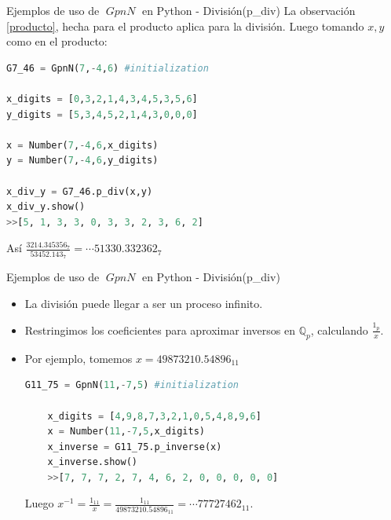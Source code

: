 \documentclass{beamer}
\theoremstyle{definition}
\numberwithin{equation}{section}
\newcommand{\Qp}{\mathbb{Q}_p}
\DeclareMathOperator{\gpn}{\mathit{{GpnN}}}
\begin{document}
\begin{frame}[fragile]{Ejemplos de uso de $\gpn$ en Python - División(p\_div) }
La observación \ref{producto}, hecha para el producto aplica para la división. Luego tomando $x,y$ como en el producto:

\begin{lstlisting}[language = Python, caption = división de números en $\mathit{G7\_46}$,basicstyle=\tiny]
G7_46 = GpnN(7,-4,6) #initialization

x_digits = [0,3,2,1,4,3,4,5,3,5,6]
y_digits = [5,3,4,5,2,1,4,3,0,0,0]

x = Number(7,-4,6,x_digits)
y = Number(7,-4,6,y_digits)

x_div_y = G7_46.p_div(x,y)
x_div_y.show()
>>[5, 1, 3, 3, 0, 3, 3, 2, 3, 6, 2]
\end{lstlisting}
Así $\frac{3214.345356_7}{53452.143_7}=\cdots51330.332362_7$
\end{frame}



\begin{frame}[fragile]{Ejemplos de uso de $\gpn$ en Python - División(p\_div) }
\begin{itemize}
	\item La división puede llegar a ser un proceso infinito.
	\item Restringimos los coeficientes para aproximar inversos en $\Qp$, calculando $\frac{1_p}{x}$.
	\item Por ejemplo, tomemos $x=49873210.54896_{11}$ 
	\begin{lstlisting}[language = Python, caption = inversión de números en $\mathit{G11\_75}$,basicstyle=\tiny]
	G11_75 = GpnN(11,-7,5) #initialization
	
	x_digits = [4,9,8,7,3,2,1,0,5,4,8,9,6]
	x = Number(11,-7,5,x_digits)
	x_inverse = G11_75.p_inverse(x)
	x_inverse.show()
	>>[7, 7, 7, 2, 7, 4, 6, 2, 0, 0, 0, 0, 0]
	\end{lstlisting}
	Luego $x^{-1}=\frac{1_{11}}{x}=\frac{1_{11}}{49873210.54896_{11}} = \cdots77727462_{11}$.
\end{itemize}	

\end{frame}
\end{document}
